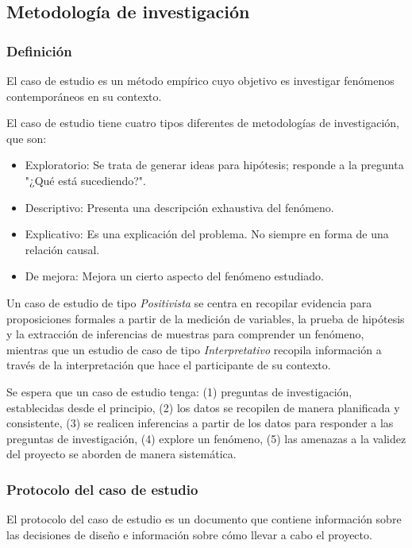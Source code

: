 \subsection{Metodología de investigación}
\subsubsection{Definición}
El caso de estudio es un método empírico cuyo objetivo es investigar fenómenos contemporáneos en su contexto.

El caso de estudio tiene cuatro tipos diferentes de metodologías de investigación, que son:
\begin{itemize}
    \item Exploratorio: Se trata de generar ideas para hipótesis; responde a la pregunta "¿Qué está sucediendo?".
    \item Descriptivo: Presenta una descripción exhaustiva del fenómeno.
    \item Explicativo: Es una explicación del problema.
No siempre en forma de una relación causal.
    \item De mejora: Mejora un cierto aspecto del fenómeno estudiado.
\end{itemize}

Un caso de estudio de tipo \textit{Positivista} se centra en recopilar evidencia para proposiciones formales a partir de la medición de variables, la prueba de hipótesis y la extracción de inferencias de muestras para comprender un fenómeno, mientras que un estudio de caso de tipo \textit{Interpretativo} recopila información a través de la interpretación que hace el participante de su contexto.

Se espera que un caso de estudio tenga: (1) preguntas de investigación, establecidas desde el principio, (2) los datos se recopilen de manera planificada y consistente, (3) se realicen inferencias a partir de los datos para responder a las preguntas de investigación, (4) explore un fenómeno, (5) las amenazas a la validez del proyecto se aborden de manera sistemática.

\subsubsection{Protocolo del caso de estudio}
El protocolo del caso de estudio es un documento que contiene información sobre las decisiones de diseño e información sobre cómo llevar a cabo el proyecto.

